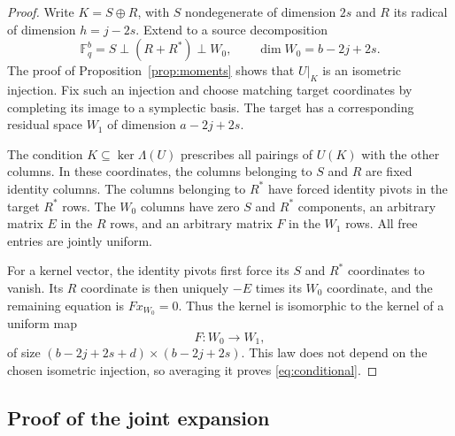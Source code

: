 \documentclass[11pt]{article}
\theoremstyle{definition}
\theoremstyle{remark}
\newcommand{\F}{\mathbb F}
\begin{document}
\begin{proof}
Write $K=S\oplus R$, with $S$ nondegenerate of dimension $2s$ and $R$ its radical of dimension $h=j-2s$. Extend to a source decomposition
\[
 \F_q^b=S\perp(R+R^*)\perp W_0,
 \qquad \dim W_0=b-2j+2s.
\]
The proof of Proposition~\ref{prop:moments} shows that $U|_K$ is an isometric injection. Fix such an injection and choose matching target coordinates by completing its image to a symplectic basis. The target has a corresponding residual space $W_1$ of dimension $a-2j+2s$.

The condition $K\subseteq\ker\Lambda(U)$ prescribes all pairings of $U(K)$ with the other columns. In these coordinates, the columns belonging to $S$ and $R$ are fixed identity columns. The columns belonging to $R^*$ have forced identity pivots in the target $R^*$ rows. The $W_0$ columns have zero $S$ and $R^*$ components, an arbitrary matrix $E$ in the $R$ rows, and an arbitrary matrix $F$ in the $W_1$ rows. All free entries are jointly uniform.

For a kernel vector, the identity pivots first force its $S$ and $R^*$ coordinates to vanish. Its $R$ coordinate is then uniquely $-E$ times its $W_0$ coordinate, and the remaining equation is $F x_{W_0}=0$. Thus the kernel is isomorphic to the kernel of a uniform map
\[
 F:W_0\longrightarrow W_1,
\]
of size $(b-2j+2s+d)\times(b-2j+2s)$. This law does not depend on the chosen isometric injection, so averaging it proves \eqref{eq:conditional}.
\end{proof}

\subsection{Proof of the joint expansion}
\end{document}
